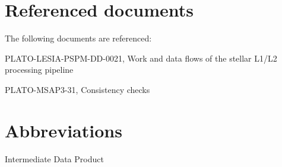 \documentclass[a4paper, oneside, 11pt, article, english]{memoir}
\begin{document}
\section{Referenced documents}
\label{sec:docs}

The following documents are referenced:

\begin{description}
  \firmlist
\item[RD1] PLATO-LESIA-PSPM-DD-0021, Work and data flows of the stellar L1/L2 processing pipeline
\item[MSAP3-31] PLATO-MSAP3-31, Consistency checks
\end{description}


\section{Abbreviations}
\label{sec:abbrev}


\begin{description}
  \firmlist
  \item[IDP] Intermediate Data Product
\end{description}
\end{document}
